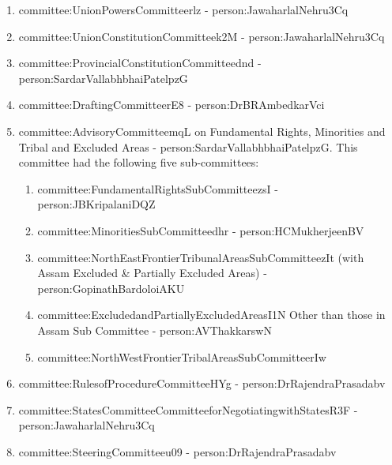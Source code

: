 \begin{enumerate}
  \item \gls{committee:UnionPowersCommitteerlz} - \gls{person:JawaharlalNehru3Cq}
  \item \gls{committee:UnionConstitutionCommitteek2M} - \gls{person:JawaharlalNehru3Cq}
  \item \gls{committee:ProvincialConstitutionCommitteednd} - \gls{person:SardarVallabhbhaiPatelpzG}
  \item \gls{committee:DraftingCommitteerE8} - \gls{person:DrBRAmbedkarVci}
  \item \gls{committee:AdvisoryCommitteemqL} on Fundamental Rights, Minorities and Tribal and Excluded Areas - \gls{person:SardarVallabhbhaiPatelpzG}. This committee had the following five sub-committees:
  \begin{enumerate}
    \item \gls{committee:FundamentalRightsSubCommitteezsI} - \gls{person:JBKripalaniDQZ}
    \item \gls{committee:MinoritiesSubCommitteedhr} - \gls{person:HCMukherjeenBV}
    \item \gls{committee:NorthEastFrontierTribunalAreasSubCommitteezIt} (with Assam Excluded \& Partially Excluded Areas) - \gls{person:GopinathBardoloiAKU}
    \item \gls{committee:ExcludedandPartiallyExcludedAreasI1N} Other than those in Assam Sub Committee - \gls{person:AVThakkarswN}
    \item \gls{committee:NorthWestFrontierTribalAreasSubCommitteerIw}
  \end{enumerate}
  
  \item \gls{committee:RulesofProcedureCommitteeHYg} - \gls{person:DrRajendraPrasadabv}
  \item \gls{committee:StatesCommitteeCommitteeforNegotiatingwithStatesR3F} - \gls{person:JawaharlalNehru3Cq}
  \item \gls{committee:SteeringCommitteeu09} - \gls{person:DrRajendraPrasadabv}
\end{enumerate}

